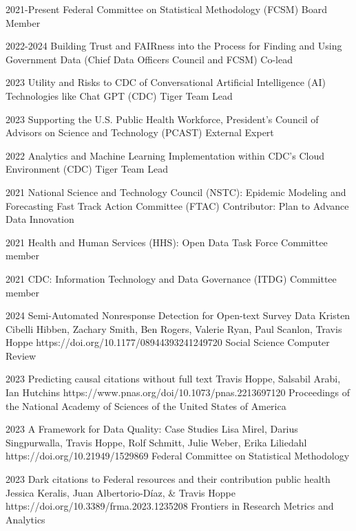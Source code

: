 \documentclass[]{scrartcl}
\begin{document}
\begin{cleanCV}
\WorkExperienceX
{2021-Present}
{Federal Committee on Statistical Methodology (FCSM)}
{Board Member}

\WorkExperienceX
{2022-2024}
{Building Trust and FAIRness into the Process for Finding and Using Government Data (Chief Data Officers Council and FCSM)}
{Co-lead}

\WorkExperienceX
{2023}
{Utility and Risks to CDC of Conversational Artificial Intelligence (AI) Technologies like Chat GPT (CDC)}
{Tiger Team Lead}

\WorkExperienceX
{2023}
{Supporting the U.S. Public Health Workforce, President's Council of Advisors on Science and Technology (PCAST)}
{External Expert}



\WorkExperienceX
{2022}
{Analytics and Machine Learning Implementation within CDC's Cloud Environment (CDC)}
{Tiger Team Lead}

\WorkExperienceX
{2021}
{National Science and Technology Council (NSTC): Epidemic Modeling and Forecasting Fast Track Action Committee (FTAC)}
{Contributor: Plan to Advance Data Innovation}

\WorkExperienceX
{2021}
{Health and Human Services (HHS): Open Data Task Force}
{Committee member}

\WorkExperienceX
{2021}
{CDC: Information Technology and Data Governance (ITDG)}
{Committee member}



\vspace{0.5em}
\Paper
{2024}
{Semi-Automated Nonresponse Detection for Open-text Survey Data}
{Kristen Cibelli Hibben, Zachary Smith, Ben Rogers, Valerie Ryan, Paul Scanlon, Travis Hoppe}
{https://doi.org/10.1177/08944393241249720}
{Social Science Computer Review}

\Paper
{2023}
{Predicting causal citations without full text}
{Travis Hoppe, Salsabil Arabi, Ian Hutchins}
{https://www.pnas.org/doi/10.1073/pnas.2213697120}
{Proceedings of the National Academy of Sciences of the United States of America}

\Paper
{2023}
{A Framework for Data Quality: Case Studies}
{Lisa Mirel, Darius Singpurwalla, Travis Hoppe, Rolf Schmitt, Julie Weber, Erika Liliedahl}
{https://doi.org/10.21949/1529869}
{Federal Committee on Statistical Methodology}

\Paper
{2023}
{Dark citations to Federal resources and their contribution public health}
{Jessica Keralis, Juan Albertorio-Díaz, \& Travis Hoppe}
{https://doi.org/10.3389/frma.2023.1235208}
{Frontiers in Research Metrics and Analytics}


\end{cleanCV}
\end{document}

